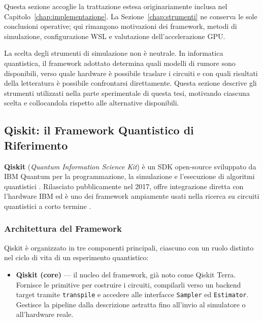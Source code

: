 \begin{onehalfspace}

Questa sezione accoglie la trattazione estesa originariamente inclusa nel
Capitolo~\ref{chap:implementazione}. La Sezione~\ref{chap:strumenti} ne conserva le
sole conclusioni operative; qui rimangono motivazioni dei framework, metodi di
simulazione, configurazione WSL e valutazione dell'accelerazione GPU.

La scelta degli strumenti di simulazione non è neutrale. In informatica quantistica, il framework adottato determina quali modelli di rumore sono disponibili, verso quale hardware è possibile traslare i circuiti e con quali risultati della letteratura è possibile confrontarsi direttamente. Questa sezione descrive gli strumenti utilizzati nella parte sperimentale di questa tesi, motivando ciascuna scelta e collocandola rispetto alle alternative disponibili.

\subsection{Qiskit: il Framework Quantistico di Riferimento}
\label{sec:qiskit}

\textbf{Qiskit} (\textit{Quantum Information Science Kit}) è un \ac{SDK} open-source sviluppato da \ac{IBM} Quantum per la programmazione, la simulazione e l'esecuzione di algoritmi quantistici \cite{qiskit2023}. Rilasciato pubblicamente nel 2017, offre integrazione diretta con l'hardware \ac{IBM} ed è uno dei framework ampiamente usati nella ricerca su circuiti quantistici a corto termine \cite{skosana2021, shor_hpec2023}.

\subsubsection{Architettura del Framework}

Qiskit è organizzato in tre componenti principali, ciascuno con un ruolo distinto nel ciclo di vita di un esperimento quantistico:

\begin{itemize}

    \item \textbf{Qiskit (core)} — il nucleo del framework, già noto come Qiskit Terra. Fornisce le primitive per costruire i circuiti, compilarli verso un backend target tramite \texttt{transpile} e accedere alle interfacce \texttt{Sampler} ed \texttt{Estimator}. Gestisce la pipeline dalla descrizione astratta fino all'invio al simulatore o all'hardware reale.


\end{itemize}
\end{onehalfspace}
